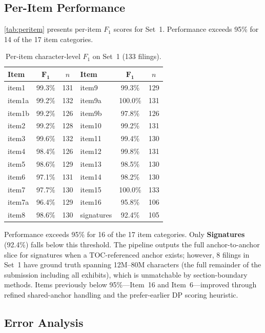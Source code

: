 \documentclass[12pt,letterpaper,oneside]{article}
\begin{document}
\subsection{Per-Item Performance}

\autoref{tab:peritem} presents per-item $F_1$ scores for Set~1.
Performance exceeds 95\% for 14 of the 17 item categories.

\begin{table}[htbp]
\centering
\caption{Per-item character-level $F_1$ on Set~1 (133 filings).}\label{tab:peritem}
\begin{tabu}{lcc|lcc}
\toprule
\textbf{Item} & $\bm{F_1}$ & \textbf{$n$} & \textbf{Item} & $\bm{F_1}$ & \textbf{$n$} \\
\midrule
item1       & 99.3\% & 131 & item9    & 99.3\% & 129 \\
item1a      & 99.2\% & 132 & item9a   & 100.0\% & 131 \\
item1b      & 99.2\% & 126 & item9b   & 97.8\% & 126 \\
item2       & 99.2\% & 128 & item10   & 99.2\% & 131 \\
item3       & 99.6\% & 132 & item11   & 99.4\% & 130 \\
item4       & 98.4\% & 126 & item12   & 99.8\% & 131 \\
item5       & 98.6\% & 129 & item13   & 98.5\% & 130 \\
item6       & 97.1\% & 131 & item14   & 98.2\% & 130 \\
item7       & 97.7\% & 130 & item15   & 100.0\% & 133 \\
item7a      & 96.4\% & 129 & item16   & 95.8\% & 106 \\
item8       & 98.6\% & 130 & signatures & 92.4\% & 105 \\
\bottomrule
\end{tabu}
\end{table}

Performance exceeds 95\% for 16 of the 17 item categories.
Only \textbf{Signatures} (92.4\%) falls below this threshold.
The pipeline outputs the full anchor-to-anchor slice for
signatures when a TOC-referenced anchor exists; however, 8 filings
in Set~1 have ground truth spanning 12M--80M characters (the
full remainder of the submission including all exhibits), which
is unmatchable by section-boundary methods. Items previously
below 95\%---Item~16 and Item~6---improved through refined
shared-anchor handling and the prefer-earlier DP scoring heuristic.

\subsection{Error Analysis}
\end{document}
